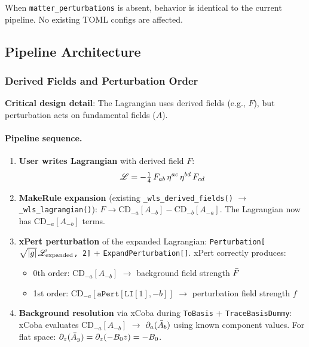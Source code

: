 When \texttt{matter\_perturbations} is absent, behavior is identical to the current pipeline. No existing TOML configs are affected.

\subsection{Pipeline Architecture}
\label{sec:mfp-pipeline}

\subsubsection{Derived Fields and Perturbation Order}
\label{sec:mfp-derived-fields}

\textbf{Critical design detail}: The Lagrangian uses derived fields (e.g., $F$), but perturbation acts on fundamental fields ($A$).

\paragraph{Pipeline sequence.}
\label{par:mfp-pipeline-sequence}

\begin{enumerate}
  \item \textbf{User writes Lagrangian} with derived field $F$:
    \begin{equation*}
      \mathscr{L} = -\tfrac{1}{4}\, F_{ab}\, \eta^{ac}\, \eta^{bd}\, F_{cd}
    \end{equation*}

  \item \textbf{MakeRule expansion} (existing \texttt{\_wls\_derived\_fields()} $\to$ \texttt{\_wls\_lagrangian()}):
    $F \to \mathrm{CD}_{-a}[A_{-b}] - \mathrm{CD}_{-b}[A_{-a}]$. The Lagrangian now has $\mathrm{CD}_{-a}[A_{-b}]$ terms.

  \item \textbf{xPert perturbation} of the expanded Lagrangian:
    \texttt{Perturbation[$\sqrt{|g|}\,\mathscr{L}_\text{expanded}$, 2]} + \texttt{ExpandPerturbation[]}.
    xPert correctly produces:
    \begin{itemize}
      \item 0th order: $\mathrm{CD}_{-a}[A_{-b}]$ $\to$ background field strength $\bar{F}$
      \item 1st order: $\mathrm{CD}_{-a}[\texttt{aPert}[\texttt{LI}[1], -b]]$ $\to$ perturbation field strength $f$
    \end{itemize}

  \item \textbf{Background resolution} via xCoba during \texttt{ToBasis} + \texttt{TraceBasisDummy}:
    xCoba evaluates $\mathrm{CD}_{-a}[A_{-b}]$ $\to$ $\partial_a(\bar{A}_b)$ using known component values.
    For flat space: $\partial_z(\bar{A}_y) = \partial_z(-B_0 z) = -B_0$.
\end{enumerate}

